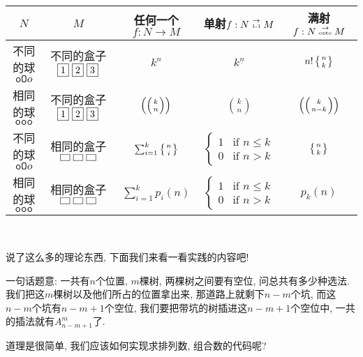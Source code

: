 {\center \begin{tabular}[pos]{|c|c|ccc|}
  \hline
  $N$ & $M$ & 任何一个$f:N\to M$ & 单射$f:N\stackrel{\to}{\text{\tiny 1-1}} M$ & 满射$f:N\stackrel{\to}{\text{\tiny onto}} M$   \\
  \hline
  不同的球$\texttt{oO}o$ & 不同的盒子$\fbox{1}~\fbox{2}~\fbox{3}$ & $k^n$ & $k^{\underline n}$ & $n!\left\{{n \atop k}\right\}$\\
  相同的球$\texttt{ooo}$ & 不同的盒子$\fbox{1}~\fbox{2}~\fbox{3}$ & $\left(\left({k \atop n}\right)\right)$ & ${k\choose n}$ & $\left(\left({k \atop n-k}\right)\right)$\\
  不同的球$\texttt{oO}o$ & 相同的盒子$\fbox{~}~\fbox{~}~\fbox{~}$ & $\sum_{i=1}^k \left\{{n \atop i}\right\}$ & $\begin{cases}1 & \text{if }n\leq k\\ 0& \text{if }n>k\end{cases}$ & $\left\{{n \atop k}\right\}$\\
  相同的球$\texttt{ooo}$ & 相同的盒子$\fbox{~}~\fbox{~}~\fbox{~}$ & $\sum_{i=1}^k p_i(n)$ & $\begin{cases}1 & \text{if }n\leq k\\ 0& \text{if }n>k\end{cases}$ & $p_k(n)$\\
  \hline
\end{tabular}\\}

说了这么多的理论东西, 下面我们来看一看实践的内容吧! 

 一句话题意: 一共有$n$个位置, $m$棵树, 两棵树之间要有空位, 问总共有多少种选法. 
我们把这$m$棵树以及他们所占的位置拿出来, 那道路上就剩下$n-m$个坑, 而这$n-m$个坑有$n-m+1$个空位, 
我们要把带坑的树插进这$n-m+1$个空位中, 一共的插法就有$A_{n-m+1}^m$了.

道理是很简单, 我们应该如何实现求排列数, 组合数的代码呢? 

